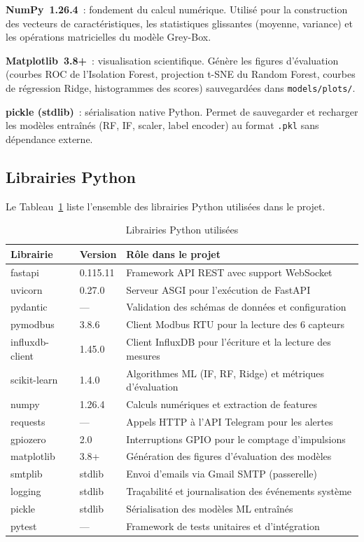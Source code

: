 \textbf{NumPy~1.26.4}~: fondement du calcul numérique. Utilisé pour la construction des vecteurs de caractéristiques, les statistiques glissantes (moyenne, variance) et les opérations matricielles du modèle Grey-Box.

\textbf{Matplotlib~3.8+}~: visualisation scientifique. Génère les figures d'évaluation (courbes ROC de l'Isolation Forest, projection t-SNE du Random Forest, courbes de régression Ridge, histogrammes des scores) sauvegardées dans \texttt{models/plots/}.

\textbf{pickle (stdlib)}~: sérialisation native Python. Permet de sauvegarder et recharger les modèles entraînés (RF, IF, scaler, label encoder) au format \texttt{.pkl} sans dépendance externe.

\subsection{Librairies Python}

Le Tableau~\ref{tab:libs_python} liste l'ensemble des librairies Python utilisées dans le projet.

\begin{table}[htbp]
\centering
\caption{Librairies Python utilisées}
\label{tab:libs_python}
\begin{tabular}{p{} p{} p{}}
\toprule
\textbf{Librairie} & \textbf{Version} & \textbf{Rôle dans le projet} \\
\midrule
fastapi & 0.115.11 & Framework API REST avec support WebSocket \\
uvicorn & 0.27.0 & Serveur ASGI pour l'exécution de FastAPI \\
pydantic & — & Validation des schémas de données et configuration \\
pymodbus & 3.8.6 & Client Modbus RTU pour la lecture des 6 capteurs \\
influxdb-client & 1.45.0 & Client InfluxDB pour l'écriture et la lecture des mesures \\
scikit-learn & 1.4.0 & Algorithmes ML (IF, RF, Ridge) et métriques d'évaluation \\
numpy & 1.26.4 & Calculs numériques et extraction de features \\
requests & — & Appels HTTP à l'API Telegram pour les alertes \\
gpiozero & 2.0 & Interruptions GPIO pour le comptage d'impulsions \\
matplotlib & 3.8+ & Génération des figures d'évaluation des modèles \\
smtplib & stdlib & Envoi d'emails via Gmail SMTP (passerelle) \\
logging & stdlib & Traçabilité et journalisation des événements système \\
pickle & stdlib & Sérialisation des modèles ML entraînés \\
pytest & — & Framework de tests unitaires et d'intégration \\
\bottomrule
\end{tabular}
\end{table}

